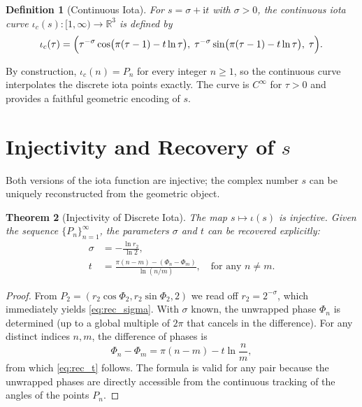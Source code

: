 \documentclass[11pt]{article}
\newtheorem{theorem}{Theorem}[section]
\newtheorem{definition}[theorem]{Definition}
\newcommand{\R}{\mathbb{R}}
\newcommand{\iu}{\mathrm{i}} %
\begin{document}
\begin{definition}[Continuous Iota]\label{def:iota_continuous}
  For $s = \sigma + \iu t$ with $\sigma > 0$, the \emph{continuous iota curve} $\iota_c(s) : [1,\infty) \to \R^3$ is defined by
  \begin{equation}
    \iota_c(\tau) = \Bigl(
      \tau^{-\sigma} \cos\bigl(\pi(\tau-1) - t \ln \tau\bigr),\;
      \tau^{-\sigma} \sin\bigl(\pi(\tau-1) - t \ln \tau\bigr),\;
      \tau
    \Bigr). \label{eq:iota_cont}
  \end{equation}
\end{definition}

By construction, $\iota_c(n) = P_n$ for every integer $n \ge 1$, so the continuous curve interpolates the discrete iota points exactly.  The curve is $C^\infty$ for $\tau > 0$ and provides a faithful geometric encoding of $s$.

\section{Injectivity and Recovery of $s$}

Both versions of the iota function are injective; the complex number $s$ can be uniquely reconstructed from the geometric object.

\begin{theorem}[Injectivity of Discrete Iota]\label{thm:inj_disc}
  The map $s \mapsto \iota(s)$ is injective.  Given the sequence $\{P_n\}_{n=1}^\infty$, the parameters $\sigma$ and $t$ can be recovered explicitly:
  \begin{align}
    \sigma &= -\frac{\ln r_2}{\ln 2}, \label{eq:rec_sigma}\\
    t &= \frac{\pi(n-m) - (\Phi_n - \Phi_m)}{\ln(n/m)}, \quad \text{for any } n \neq m. \label{eq:rec_t}
  \end{align}
\end{theorem}
\begin{proof}
  From $P_2 = (r_2\cos\Phi_2, r_2\sin\Phi_2, 2)$ we read off $r_2 = 2^{-\sigma}$, which immediately yields \eqref{eq:rec_sigma}.  With $\sigma$ known, the unwrapped phase $\Phi_n$ is determined (up to a global multiple of $2\pi$ that cancels in the difference).  For any distinct indices $n,m$, the difference of phases is
  \[
    \Phi_n - \Phi_m = \pi(n-m) - t \ln\frac{n}{m},
  \]
  from which \eqref{eq:rec_t} follows.  The formula is valid for any pair because the unwrapped phases are directly accessible from the continuous tracking of the angles of the points $P_n$.
\end{proof}
\end{document}
